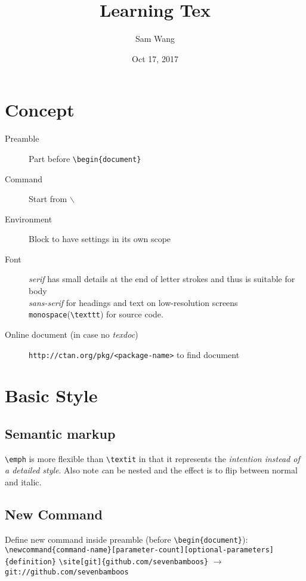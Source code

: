 \documentclass{article}
\title{Learning Tex}
\author{Sam Wang}
\date{Oct 17, 2017}
\newcommand{\site}[2][protocol]{\texttt{#1://#2}}
\begin{document}
\maketitle

\tableofcontents

\section{Concept}
\begin{description}
\item[Preamble]Part before \verb|\begin{document}|
\item[Command]Start from $\backslash$
\item[Environment]Block to have settings in its own scope
\item[Font]\emph{serif} has small details at the end of letter strokes and thus is suitable for body
\\ \emph{sans-serif} for headings and text on low-resolution screens
\\ \texttt{monospace}(\verb|\texttt|) for source code. 
\item[Online document (in case no \emph{texdoc})]\site[http]{ctan.org/pkg/<package-name>} to find document
\end{description}

\section{Basic Style}
\subsection{Semantic markup}

\verb|\emph| is more flexible than \verb|\textit| in that it represents the \emph{\emph{intention} instead of a detailed style}.
Also note \emph can be nested and the effect is to flip between normal and italic.

\subsection{New Command}
Define new command inside preamble (before \verb|\begin{document}|):
\\ \verb|\newcommand{command-name}[parameter-count][optional-parameters]{definition}|
\verb|\site[git]{github.com/sevenbamboos}| $\rightarrow$ \site[git]{github.com/sevenbamboos}
\end{document}
